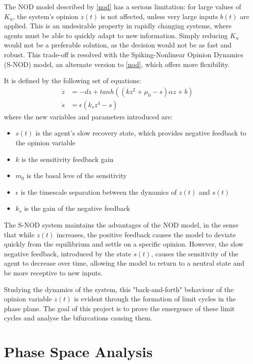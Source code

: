 \documentclass[12pt]{article}
\begin{document}
The NOD model described by \ref{nod} has a serious limitation: for large values of $K_u$, the system's opinion $z(t)$
is not affected, unless very large inputs $b(t)$ are applied. This is an undesirable property in rapidly changing systems, where 
agents must be able to quickly adapt to new information. Simply reducing $K_u$ would not be a preferable solution, as the decision 
would not be as fast and robust. This trade-off is resolved with the Spiking-Nonlinear Opinion Dynamics (S-NOD) model, an alternate version to 
\ref{nod}, which offers more flexibility. 

It is defined by the following set of equations: 
\begin{align}
    \dot{z} & = -d z + tanh((k z^2 + \mu_0 - s)\alpha z + b) \\
    \dot{s} & = \epsilon (k_s z^4 - s)
    \label{snod}
\end{align}
where the new variables and parameters introduced are: 
\begin{itemize}
    \item $s(t)$ is the agent's slow recovery state, which provides negative feedback to the opinion variable 
    \item $k$ is the sensitivity feedback gain
    \item $m_0$ is the basal leve of the sensitivity 
    \item $\epsilon$ is the timescale separation between the dynamics of $z(t)$ and $s(t)$
    \item $k_s$ is the gain of the negative feedback 
\end{itemize}

The S-NOD system maintains the advantages of the NOD model, in the sense that while $z(t)$ increases, the positive feedback causes 
the model to deviate quickly from the equilibrium and settle on a specific opinion. However, the slow negative feedback, introduced 
by the state $s(t)$, causes the sensitivity of the agent to decrease over time, allowing the model to return to a neutral state and be more 
receptive to new inputs. 

Studying the dynamics of the system, this "back-and-forth" behaviour of the opinion variable $z(t)$ is evident through the 
formation of limit cycles in the phase plane. The goal of this project is to prove the emergence of these limit cycles and analyse 
the bifurcations causing them. 

\section{Phase Space Analysis}
\end{document}
